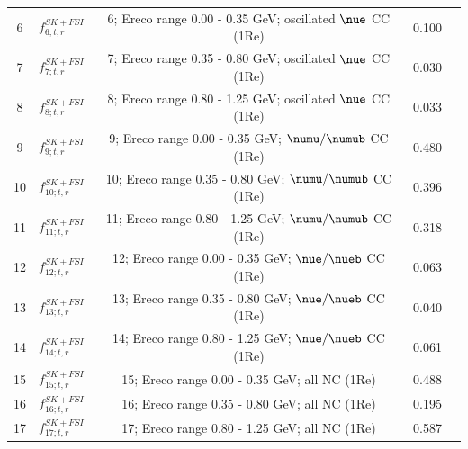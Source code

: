 {\begin{table}
\begin{tabular}{| c | c | c | c | c |}
6      &  $f_{6; t, r}^{SK+FSI}$                  &   6; Ereco range 0.00 - 0.35 GeV; oscillated \(\nue\)  CC (1Re)               & 0.100      \\ 
7      &  $f_{7; t, r}^{SK+FSI}$                  &   7; Ereco range 0.35 - 0.80 GeV; oscillated \(\nue\)  CC (1Re)               & 0.030      \\ 
8      &  $f_{8; t, r}^{SK+FSI}$                  &   8; Ereco range 0.80 - 1.25 GeV; oscillated \(\nue\)  CC (1Re)               & 0.033      \\ 
9      &  $f_{9; t, r}^{SK+FSI}$                  &   9; Ereco range 0.00 - 0.35 GeV; \(\numu/\numub\) CC (1Re)                 & 0.480      \\ 
10     &  $f_{10; t, r}^{SK+FSI}$                 &  10; Ereco range 0.35 - 0.80 GeV; \(\numu/\numub\) CC (1Re)                 & 0.396      \\ 
11     &  $f_{11; t, r}^{SK+FSI}$                 &  11; Ereco range 0.80 - 1.25 GeV; \(\numu/\numub\) CC (1Re)                 & 0.318      \\ 
12     &  $f_{12; t, r}^{SK+FSI}$                 &  12; Ereco range 0.00 - 0.35 GeV; \(\nue/\nueb\) CC (1Re)                   & 0.063      \\ 
13     &  $f_{13; t, r}^{SK+FSI}$                 &  13; Ereco range 0.35 - 0.80 GeV; \(\nue/\nueb\) CC (1Re)                   & 0.040      \\ 
14     &  $f_{14; t, r}^{SK+FSI}$                 &  14; Ereco range 0.80 - 1.25 GeV; \(\nue/\nueb\) CC (1Re)                   & 0.061      \\ 
15     &  $f_{15; t, r}^{SK+FSI}$                 &  15; Ereco range 0.00 - 0.35 GeV; all NC (1Re)                          & 0.488      \\ 
16     &  $f_{16; t, r}^{SK+FSI}$                 &  16; Ereco range 0.35 - 0.80 GeV; all NC (1Re)                          & 0.195      \\ 
17     &  $f_{17; t, r}^{SK+FSI}$                 &  17; Ereco range 0.80 - 1.25 GeV; all NC (1Re)                          & 0.587      \\ 


\end{tabular}
\end{table}}
